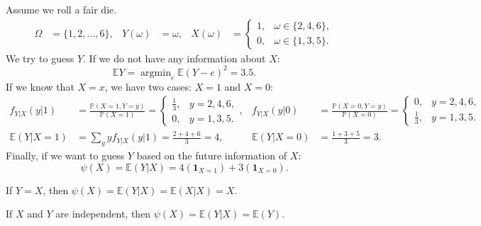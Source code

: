 \documentclass{huhtakm-template-book-v2}
\newcommand{\prob}{\mathbb{P}}
\newcommand{\expect}{\mathbb{E}}
\DeclareMathOperator*{\argmin}{argmin}
\begin{document}
    \begin{eg}
        Assume we roll a fair die.
        \begin{align*}
            \Omega &= \{1,2,\dots,6\}, & Y(\omega) &= \omega, & X(\omega) &= \begin{cases}
                1, &\omega \in \{2,4,6\},\\
                0, &\omega \in \{1,3,5\}.
            \end{cases}
        \end{align*}
        We try to guess $Y$. If we do not have any information about $X$:
        \begin{equation*}
            \expect{Y} = \argmin_{e}\expect{(Y-e)^{2}} = 3.5.
        \end{equation*}
        If we know that $X = x$, we have two cases: $X = 1$ and $X = 0$:
        \begin{align*}
            f_{Y|X}(y|1) &= \frac{\prob(X = 1,Y = y)}{\prob(X = 1)} = \begin{cases}
                \frac{1}{3}, &y = 2,4,6,\\
                0, &y = 1,3,5.
            \end{cases}, & f_{Y|X}(y|0) &= \frac{\prob(X = 0,Y = y)}{\prob(X = 0)} = \begin{cases}
                0, &y = 2,4,6,\\
                \frac{1}{3}, &y = 1,3,5.
            \end{cases}\\
            \expect(Y|X = 1) &= \sum_{y}yf_{Y|X}(y|1) = \frac{2+4+6}{3} = 4, & \expect(Y|X = 0) &= \frac{1+3+5}{3} = 3.
        \end{align*}
        Finally, if we want to guess $Y$ based on the future information of $X$:
        \begin{equation*}
            \psi(X) = \expect(Y|X) = 4(\mathbf{1}_{X = 1})+3(\mathbf{1}_{X = 0}).
        \end{equation*}
    \end{eg}
    \begin{eg}
        If $Y = X$, then $\psi(X) = \expect(Y|X) = \expect(X|X) = X$.
    \end{eg}
    \begin{eg}
        If $X$ and $Y$ are independent, then $\psi(X) = \expect(Y|X) = \expect(Y)$.
    \end{eg}
    \newpage
\end{document}
